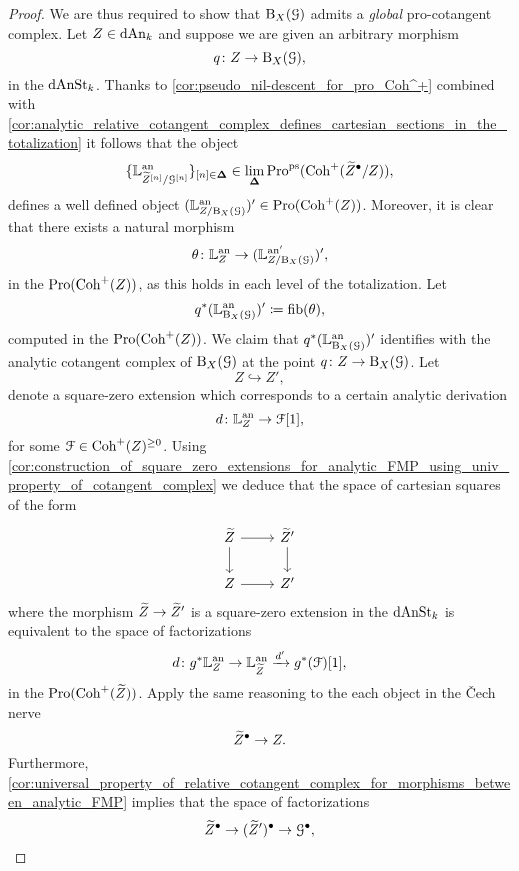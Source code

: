 \documentclass[10pt,a4paper,reqno]{amsart} %
\theoremstyle{plain}
\theoremstyle{definition}
\theoremstyle{remark}
\numberwithin{equation}{section}
\begin{document}
\begin{proof}
    
    We are thus required to show that $\mathrm B_X(\mathcal G)$ admits
    a \emph{global} pro-cotangent complex. Let $Z \in \mathrm{dAn}_k$ and suppose we are given an arbitrary morphism
        \[
            q \colon Z \to \mathrm B_X(\mathcal G),    
        \]
    in the \infcat $\mathrm{dAnSt}_k$.
    Thanks to \cref{cor:pseudo_nil-descent_for_pro_Coh^+} combined with \cref{cor:analytic_relative_cotangent_complex_defines_cartesian_sections_in_the_totalization}
    it follows that the object
        \[
            \{ \mathbb L^\mathrm{an}_{\widetilde Z^{[n]} / \mathcal G^{[n]}} \}_{[n] \in \bm{\Delta}} \in \lim_{\bm{\Delta}} \mathrm{Pro}^\mathrm{ps}(\mathrm{Coh}^+(\widetilde Z^\bullet / Z)), 
        \]
    defines a well defined object $ (\mathbb L^{\mathrm{an}}_{Z/ \mathrm B_X(\mathcal G)})' \in \mathrm{Pro}(\mathrm{Coh}^+(Z))$. Moreover, it is clear that there exists a natural morphism
        \[
            \theta \colon \mathbb L^\mathrm{an}_Z \to (\mathbb L^{\mathrm{an} '}_{Z /  \mathrm B_X(\mathcal G)})',
        \]
    in the \infcat $\mathrm{Pro}(\mathrm{Coh}^+(Z))$, as this holds in each level of the totalization. Let
        \[
            q^* (\mathbb L^{\mathrm{an}}_{\mathrm B_X(\mathcal G)})'  \coloneqq \mathrm{fib}(\theta),
        \]
    computed in the \infcat $\mathrm{Pro}(\mathrm{Coh}^+(Z))$. We claim that $q^* (\mathbb L^{\mathrm{an} }_{\mathrm B_X(\mathcal G)})'$ identifies with the analytic cotangent
    complex of $\mathrm B_X(\mathcal G)$ at the point $q \colon Z \to \mathrm B_X(\mathcal G)$. Let
        \[
            Z \hookrightarrow Z',  
        \]
    denote a square-zero extension which corresponds to a certain analytic derivation
        \[
            d \colon \mathbb L^\mathrm{an}_Z \to \mathcal F[1],  
        \]
    for some $\mathcal F \in \mathrm{Coh}^+(Z)^{\ge 0}$. Using \cref{cor:construction_of_square_zero_extensions_for_analytic_FMP_using_univ_property_of_cotangent_complex}
    we deduce that the space of cartesian squares of the form 
        \[
        \begin{tikzcd}
            \tZ \ar{r} \ar{d} & \tZ' \ar{d} \\
            Z \ar{r} & Z'
        \end{tikzcd}
        \]
    where the morphism $\widetilde Z \to \widetilde Z'$ is a square-zero extension in the \infcat $\mathrm{dAnSt}_k$ is equivalent to the space of factorizations
        \[
            d \colon g^*  \mathbb L^\mathrm{an}_Z \to \mathbb L^\mathrm{an}_{\widetilde Z} \xrightarrow{{d'}} g^*(\mathcal F)[1],
        \]
    in the \infcat $\mathrm{Pro}(\mathrm{Coh}^+(\widetilde Z))$. Apply the same reasoning to the each object in the \v{C}ech nerve
        \[
            \widetilde Z^\bullet \to Z.  
        \]
    Furthermore, \cref{cor:universal_property_of_relative_cotangent_complex_for_morphisms_between_analytic_FMP}
    implies that the space of factorizations
        \[
            \widetilde Z^\bullet \to (\widetilde Z')^\bullet \to \mathcal G^\bullet,  
\]
\end{proof}
\end{document}
